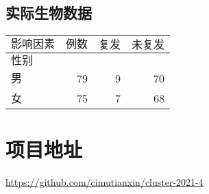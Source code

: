 \documentclass[12pt]{article}
\numberwithin{figure}{section}
\begin{document}
\subsection{实际生物数据}

\begin{table}[H]
    \centering
    \begin{tabular}{lrrr}
    \hline
    $\text{影响因素}$ & \multicolumn{1}{l}{$\text{例数}$} & \multicolumn{1}{l}{$\text{复发}$} & \multicolumn{1}{l}{$\text{未复发}$} \\ \hline
    \multicolumn{4}{l}{$\text{性别}$}                                                                                      \\
    $\text{男}$    & 79                              & 9                               & 70                               \\
    $\text{女}$    & 75                              & 7                               & 68                               \\ \hline
    \end{tabular}
\end{table}












\section{项目地址}
\url{https://github.com/cimutianxin/cluster-2021-4}
\end{document}
